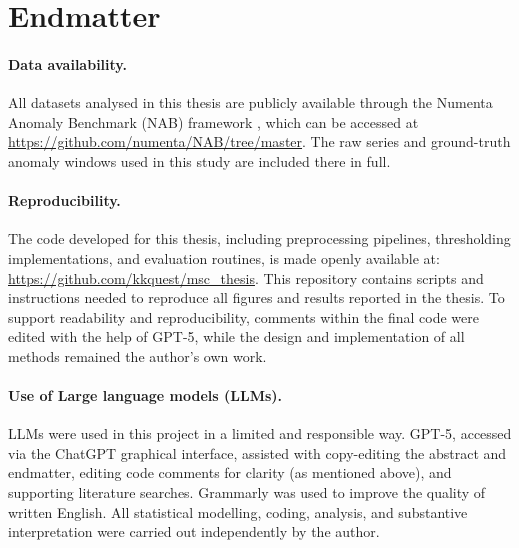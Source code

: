 \documentclass{statsmsc}
\begin{document}
\section{Endmatter}\label{sec:endmatter}

\paragraph{Data availability.} 
All datasets analysed in this thesis are publicly available through the Numenta Anomaly Benchmark (NAB) framework
\citep{lavin2015evaluating}, which can be accessed at \url{https://github.com/numenta/NAB/tree/master}. 
The raw series and ground-truth anomaly windows used in this study are included there in full.

\paragraph{Reproducibility.} 
The code developed for this thesis, including preprocessing pipelines, thresholding implementations, and evaluation 
routines, is made openly available at:  
\url{https://github.com/kkquest/msc_thesis}.  
This repository contains scripts and instructions needed to reproduce all figures and results reported in the thesis. 
To support readability and reproducibility, comments within the final code were edited with the help of GPT-5, while 
the design and implementation of all methods remained the author’s own work.

\paragraph{Use of Large language models (LLMs).} 
LLMs were used in this project in a limited and responsible way. GPT-5, accessed via the ChatGPT graphical interface, 
assisted with copy-editing the abstract and endmatter, editing code comments for clarity (as mentioned above), and supporting 
literature searches. Grammarly was used to improve the quality of written English. All statistical modelling, 
coding, analysis, and substantive interpretation were carried out independently by the author.


%
%
%
%
%
%

%
%
\end{document}
